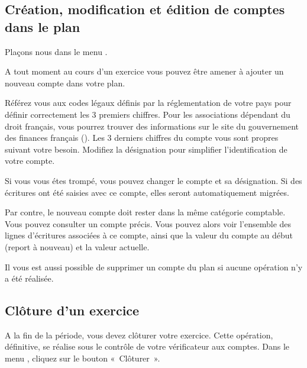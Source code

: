 \documentclass[a4paper,10pt,oneside,french]{sphinxmanual}
\begin{document}
\subsection{Création, modification et édition de comptes dans le plan}
\label{\detokenize{accounting/fiscalyear:creation-modification-et-edition-de-comptes-dans-le-plan}}
Plaçons nous dans le menu .

A tout moment au cours d’un exercice vous pouvez être amener à ajouter un nouveau compte dans votre plan.
\begin{quote}

\noindent{}
\end{quote}

Référez vous aux codes légaux définis par la réglementation de votre pays pour définir correctement les 3 premiers chiffres.
Pour les associations dépendant du droit français, vous pourrez trouver des informations sur le site du gouvernement des finances français ().
Les 3 derniers chiffres du compte vous sont propres suivant votre besoin. Modifiez la désignation pour simplifier l’identification de votre compte.

Si vous vous étes trompé, vous pouvez changer le compte et sa désignation. Si des écritures ont été saisies avec ce compte, elles seront automatiquement migrées.

Par contre, le nouveau compte doit rester dans la même catégorie comptable.
Vous pouvez consulter un compte précis. Vous pouvez alors voir
l’ensemble des lignes d’écritures associées à ce compte, ainsi que la
valeur du compte au début (report à nouveau) et la valeur actuelle.
\begin{quote}

\noindent{}
\end{quote}

Il vous est aussi possible de supprimer un compte du plan si aucune opération n’y a été réalisée.


\subsection{Clôture d’un exercice}
\label{\detokenize{accounting/fiscalyear:cloture-d-un-exercice}}
A la fin de la période, vous devez clôturer votre exercice. Cette
opération, définitive, se réalise sous le contrôle de votre
vérificateur aux comptes.
Dans le menu , cliquez sur le bouton « Clôturer ».
\end{document}
